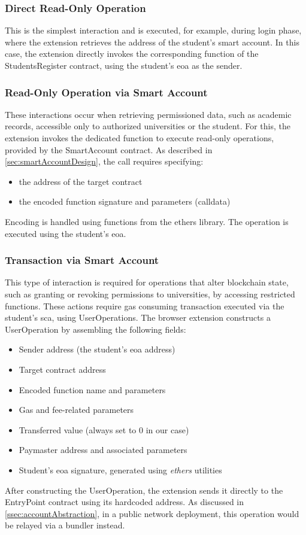 \subsubsection{Direct Read-Only Operation}
This is the simplest interaction and is executed, for example, during login phase, where the extension retrieves the address of the student's smart account. In this case, the extension directly invokes the corresponding function of the StudentsRegister contract, using the student's \gls{eoa} as the sender. 

\subsubsection{Read-Only Operation via Smart Account}
These interactions occur when retrieving permissioned data, such as academic records, accessible only to authorized universities or the student. For this, the extension invokes the dedicated function to execute read-only operations, provided by the SmartAccount contract. As described in \cref{sec:smartAccountDesign}, the call requires specifying:

\begin{itemize}
    \item the address of the target contract
    \item the encoded function signature and parameters (calldata)
\end{itemize}
Encoding is handled using functions from the ethers library. The operation is executed using the student's \gls{eoa}.

\subsubsection{Transaction via Smart Account}
This type of interaction is required for operations that alter blockchain state, such as granting or revoking permissions to universities, by accessing restricted functions. These actions require gas consuming transaction executed via the student's \gls{sca}, using UserOperations.
The browser extension constructs a UserOperation by assembling the following fields:
\begin{itemize}
    \item Sender address (the student's \gls{eoa} address)
    \item Target contract address
    \item Encoded function name and parameters
    \item Gas and fee-related parameters
    \item Transferred value (always set to 0 in our case)
    \item Paymaster address and associated parameters
    \item Student's \gls{eoa} signature, generated using \textit{ethers} utilities
\end{itemize}
After constructing the UserOperation, the extension sends it directly to the EntryPoint contract using its hardcoded address. As discussed in \cref{ssec:accountAbstraction}, in a public network deployment, this operation would be relayed via a bundler instead.

